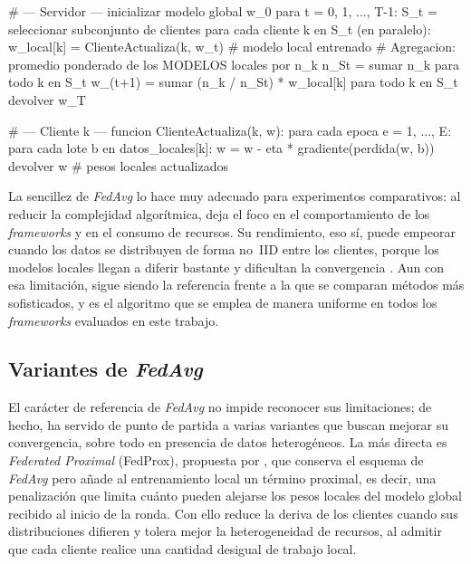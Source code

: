 \providecommand{\tagstop}{}
\providecommand{\tagstart}{}
\tagstop
\begin{pythoncode}[title={Pseudocódigo de Federated Averaging (FedAvg)}, label={cod:fedavg}, list entry={\protect\numberline{\thelisting}Pseudocódigo de Federated Averaging (FedAvg)}]
# --- Servidor ---
inicializar modelo global w_0
para t = 0, 1, ..., T-1:
    S_t = seleccionar subconjunto de clientes
    para cada cliente k en S_t (en paralelo):
        w_local[k] = ClienteActualiza(k, w_t)      # modelo local entrenado
    # Agregacion: promedio ponderado de los MODELOS locales por n_k
    n_St = sumar n_k para todo k en S_t
    w_(t+1) = sumar (n_k / n_St) * w_local[k] para todo k en S_t
devolver w_T

# --- Cliente k ---
funcion ClienteActualiza(k, w):
    para cada epoca e = 1, ..., E:
        para cada lote b en datos_locales[k]:
            w = w - eta * gradiente(perdida(w, b))
    devolver w                                       # pesos locales actualizados
\end{pythoncode}
\tagstart

La sencillez de \textit{FedAvg} lo hace muy adecuado para experimentos comparativos: al
reducir la complejidad algorítmica, deja el foco en el comportamiento de los
\textit{frameworks} y en el consumo de recursos. Su rendimiento, eso sí, puede empeorar
cuando los datos se distribuyen de forma no~IID entre los clientes, porque los modelos
locales llegan a diferir bastante y dificultan la convergencia
\parencite{li2020federated}. Aun con esa limitación, sigue siendo la referencia frente a
la que se comparan métodos más sofisticados, y es el algoritmo que se emplea de manera
uniforme en todos los \textit{frameworks} evaluados en este trabajo.

\subsection{Variantes de \textit{FedAvg}}\label{sec:variantes}

El carácter de referencia de \textit{FedAvg} no impide reconocer sus limitaciones; de
hecho, ha servido de punto de partida a varias variantes que buscan mejorar su
convergencia, sobre todo en presencia de datos heterogéneos. La más directa es
\textit{Federated Proximal} (FedProx), propuesta por \textcite{li2020fedprox}, que
conserva el esquema de \textit{FedAvg} pero añade al entrenamiento local un término
proximal, es decir, una penalización que limita cuánto pueden alejarse los pesos locales
del modelo global recibido al inicio de la ronda. Con ello reduce la deriva de los
clientes cuando sus distribuciones difieren y tolera mejor la heterogeneidad de recursos,
al admitir que cada cliente realice una cantidad desigual de trabajo local.

